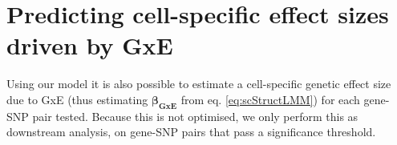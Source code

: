 












\newpage
\section{Predicting cell-specific effect sizes driven by GxE}

Using our model it is also possible to estimate a cell-specific genetic effect size due to GxE (thus estimating $\boldsymbol{\beta_{GxE}}$ from eq. \eqref{eq:scStructLMM}) for each gene-SNP pair tested.
Because this is not optimised, we only perform this as downstream analysis, on gene-SNP pairs that pass a significance threshold.\\

